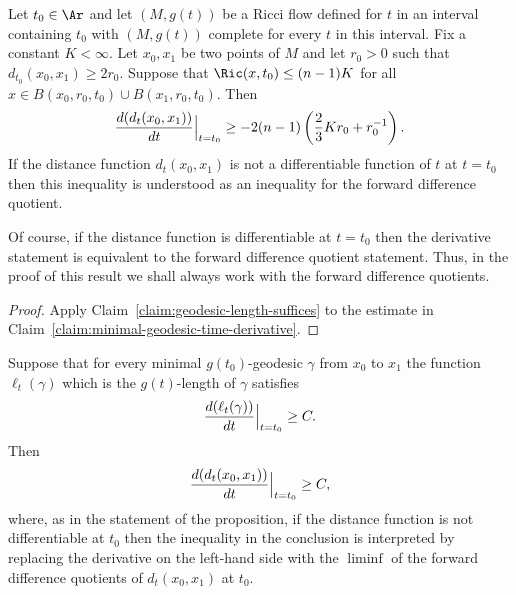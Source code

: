 \begin{proposition}\label{prop:distance-variation-lower-bound}
\label{I.8.3}

 Let $t_0\in \Ar$ and let $(M,g(t))$ be a Ricci flow defined for $t$ in an interval containing $t_0$
 with $(M,g(t))$ complete for every $t$ in this interval. Fix a constant $K<\infty$.  Let $x_0,x_1$ be two points
of $M$ and let $r_0>0$ such that $d_{t_0}(x_0,x_1)\ge 2r_0$. Suppose
that $\Ric(x,t_0)\le (n-1)K$ for all $x\in B(x_0,r_0,t_0)\cup
B(x_1,r_0,t_0)$. Then
$$\frac{d(d_t(x_0,x_1))}{dt}\Bigl|_{t=t_0}\Bigr.\ge -2(n-1)\left(\frac{2}{3}Kr_0+r_0^{-1}\right).$$
 If the distance function $d_{t}(x_0,x_1)$ is not a differentiable
function of $t$ at $t=t_0$ then this inequality is understood as an
inequality for the forward difference quotient.
\end{proposition}


\begin{remark}\label{rem:forward-difference-quotient}
\leanok
Of course, if the distance function is differentiable at $t=t_0$
then the derivative statement is equivalent to the forward
difference quotient statement. Thus, in the proof of this result we
shall always work with the forward difference quotients.
\end{remark}

\begin{proof}
\sketch Apply Claim~\ref{claim:geodesic-length-suffices} to the estimate in
Claim~\ref{claim:minimal-geodesic-time-derivative}.

\end{proof}

\begin{claim}\label{claim:geodesic-length-suffices}
\leanok
\label{geosuff}

Suppose that for every minimal $g(t_0)$-geodesic $\gamma$ from $x_0$
to $x_1$ the function $\ell_t(\gamma)$ which is the $g(t)$-length of
$\gamma$ satisfies
$$\frac{d(\ell_t(\gamma))}{dt}\Bigl|_{t=t_0}\Bigr.\ge C.$$
Then
$$\frac{d(d_t(x_0,x_1))}{dt}\Bigl|_{t=t_0}\Bigr.\ge C,$$
where, as in the statement of the proposition, if the distance
function is not differentiable at $t_0$ then the inequality in the
conclusion is interpreted by replacing the derivative on the
left-hand side with the $\liminf$ of the forward difference
quotients of $d_t(x_0,x_1)$ at  $t_0$.
\end{claim}

